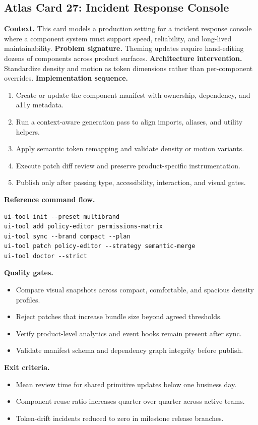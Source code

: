 \subsection*{Atlas Card 27: Incident Response Console}
\textbf{Context.} This card models a production setting for a incident response console where a component system must support speed, reliability, and long-lived maintainability.
\textbf{Problem signature.} Theming updates require hand-editing dozens of components across product surfaces.
\textbf{Architecture intervention.} Standardize density and motion as token dimensions rather than per-component overrides.
\textbf{Implementation sequence.}
\begin{enumerate}[leftmargin=*, itemsep=0.28em]
  \item Create or update the component manifest with ownership, dependency, and a11y metadata.
  \item Run a context-aware generation pass to align imports, aliases, and utility helpers.
  \item Apply semantic token remapping and validate density or motion variants.
  \item Execute patch diff review and preserve product-specific instrumentation.
  \item Publish only after passing type, accessibility, interaction, and visual gates.
\end{enumerate}
\textbf{Reference command flow.}
\begin{verbatim}
ui-tool init --preset multibrand
ui-tool add policy-editor permissions-matrix
ui-tool sync --brand compact --plan
ui-tool patch policy-editor --strategy semantic-merge
ui-tool doctor --strict
\end{verbatim}
\textbf{Quality gates.}
\begin{itemize}[leftmargin=*, itemsep=0.24em]
  \item Compare visual snapshots across compact, comfortable, and spacious density profiles.
  \item Reject patches that increase bundle size beyond agreed thresholds.
  \item Verify product-level analytics and event hooks remain present after sync.
  \item Validate manifest schema and dependency graph integrity before publish.
\end{itemize}
\textbf{Exit criteria.}
\begin{itemize}[leftmargin=*, itemsep=0.24em]
  \item Mean review time for shared primitive updates below one business day.
  \item Component reuse ratio increases quarter over quarter across active teams.
  \item Token-drift incidents reduced to zero in milestone release branches.
\end{itemize}
\clearpage
